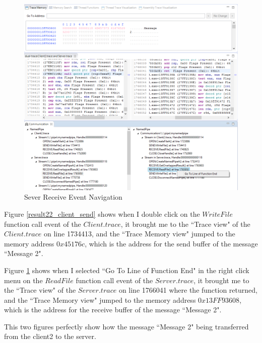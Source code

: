 \begin{figure}[H]
\centerline{\includegraphics[scale=0.4]{Figures/result22_server_read}}
 \caption{Sever Receive Event Navigation}
\label{result22_server_read}
\end{figure}

Figure \ref{result22_client_send} shows when I double click on the $WriteFile$ function call event of the $Client.trace$, it brought me to the ``Trace view" of the $Client.trace$ on line 1734413, and the ``Trace Memory view" jumped to the memory address $0x45176c$, which is the address for the send buffer of the message ``Message 2".

Figure \ref{result22_server_read} shows when I selected ``Go To Line of Function End" in the right click menu on the $ReadFile$ function call event of the $Server.trace$, it brought me to the ``Trace view" of the $Server.trace$ on line 1766041 where the function returned, and the ``Trace Memory view" jumped to the memory address $0x13FF93608$, which is the address for the receive buffer of the message ``Message 2".

This two figures perfectly show how the message ``Message 2" being transferred from the client2 to the server.

